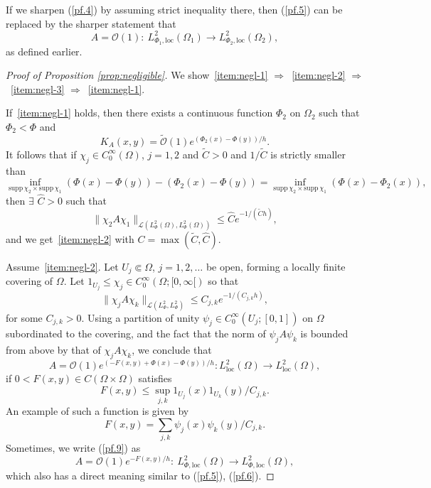 \documentclass{article}
\begin{document}
If we sharpen (\ref{pf.4}) by assuming strict inequality there, then
(\ref{pf.5}) can be replaced by the sharper statement that
\[
A=\mathcal{ O}(1):\ L^2_{\Phi _1,\mathrm{loc}}(\Omega _1)\to L^2_{\Phi
  _2,\mathrm{loc}}(\Omega _2),
\]
as defined earlier.
\begin{proof}[Proof of Proposition \ref{prop:negligible}] We
  show~\ref{item:negl-1} $\Rightarrow$~\ref{item:negl-2}
  $\Rightarrow$~\ref{item:negl-3} $\Rightarrow$~\ref{item:negl-1}.


  If~\ref{item:negl-1} holds, then there exists a continuous function
  $\Phi_2$ on $\Omega_2$ such that $\Phi_2<\Phi$ and
  \begin{equation}\label{pf.8}
    K_A(x,y)=\widetilde{\mathcal{ O}} (1)e^{(\Phi _2(x)-\Phi (y))/h}.
  \end{equation}
  It follows that if $\chi _j\in C_0^\infty (\Omega )$, $j=1,2$ and
  $\widetilde{C}>0$ and $1/\widetilde{C}$ is strictly smaller than
  \[
  \inf_{\mathrm{supp\,}\chi _2\times \mathrm{supp\,}\chi _1}(\Phi
  (x)-\Phi (y))-(\Phi _2(x)-\Phi (y)) = \inf_{\mathrm{supp\,}\chi
    _2\times \mathrm{supp\,}\chi _1}(\Phi (x)-\Phi _2(x)),
  \]
  then $\exists$ $\widehat{C}>0$ such that
  \[
  \| \chi _2A\chi _1\|_{\mathcal{ L}(L^2_\Phi (\Omega ), L^2_\Phi
    (\Omega ))}\le \widehat{C}e^{-1/(\widetilde{C}h)},
  \]
  and we get~\ref{item:negl-2} with
  $C=\max (\widetilde{C},\widehat{C})$.

  Assume~\ref{item:negl-2}. Let $U_j\Subset \Omega $, $j=1,2,\dots$ be
  open, forming a locally finite covering of $\Omega $. Let
  $1_{U_j}\le \chi _j\in C_0^\infty (\Omega ;[0,\infty [)$ so that
  \[
  \| \chi _j A\chi _k\|_{\mathcal{ L}(L^2_\Phi ,L^2_\Phi )}\le
  C_{j,k}e^{-1/(C_{j,k}h)},
  \]
  for some $C_{j,k}>0$.  Using a partition of unity
  $\psi _j\in C_0^\infty (U_j;[0,1])$ on $\Omega $ subordinated to the
  covering, and the fact that the norm of $\psi _jA\psi _k$ is bounded
  from above by that of $\chi _jA\chi _k$, we conclude that
  \begin{equation}\label{pf.9}
    A=\mathcal{ O}(1)e^{(-F(x,y)+\Phi (x)-\Phi
      (y))/h}:L^2_{\mathrm{loc}}(\Omega )\to L^2_{\mathrm{loc}}(\Omega ),
  \end{equation}
  if $0<F(x,y)\in C(\Omega \times \Omega )$ satisfies
  \begin{equation}\label{pf.10}
    F(x,y)\le \sup_{j,k}1_{U_j}(x)1_{U_k}(y)/C_{j,k}.
  \end{equation}
  An example of such a function is given by
  \begin{equation}\label{pf.11}
    F(x,y)=\sum_{j,k}\psi _j(x)\psi _k(y)/C_{j,k}.
  \end{equation}
  Sometimes, we write (\ref{pf.9}) as
  \begin{equation}\label{pf.12}
    A=\mathcal{ O}(1)e^{-F(x,y)/h}:\ L^2_{\Phi,\mathrm{loc}}(\Omega )\to L^2_{\Phi ,\mathrm{loc}}(\Omega ), 
  \end{equation}
  which also has a direct meaning similar to (\ref{pf.5}),
  (\ref{pf.6}).


\end{proof}
\end{document}
